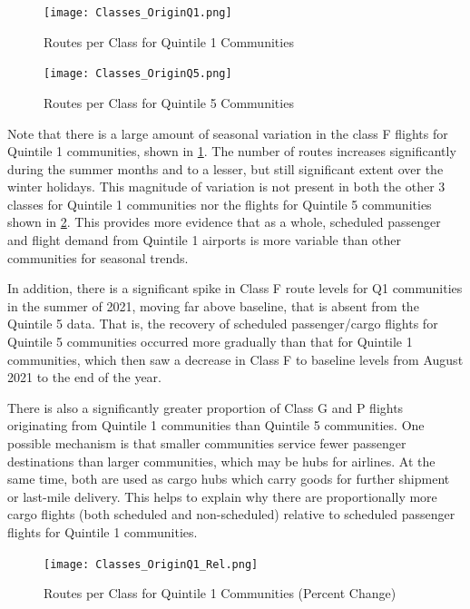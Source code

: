 \documentclass[11pt]{article}
\begin{document}
\begin{figure}[htbp]
\centerline{\texttt{[image: Classes\_OriginQ1.png]}}
\caption{Routes per Class for Quintile 1 Communities}
\label{Classes_OriginQ1}
\end{figure}

\begin{figure}[htbp]
\centerline{\texttt{[image: Classes\_OriginQ5.png]}}
\caption{Routes per Class for Quintile 5 Communities}
\label{Classes_OriginQ5}
\end{figure}

\-\hspace{0.5cm} Note that there is a large amount of seasonal variation in the class F flights for Quintile 1 communities, shown in \cref{Classes_OriginQ1}. The number of routes increases significantly during the summer months and to a lesser, but still significant extent over the winter holidays. This magnitude of variation is not present in both the other 3 classes for Quintile 1 communities nor the flights for Quintile 5 communities shown in \cref{Classes_OriginQ5}. This provides more evidence that as a whole, scheduled passenger and flight demand from Quintile 1 airports is more variable than other communities for seasonal trends.

\-\hspace{0.5cm} In addition, there is a significant spike in Class F route levels for Q1 communities in the summer of 2021, moving far above baseline, that is absent from the Quintile 5 data. That is, the recovery of scheduled passenger/cargo flights for Quintile 5 communities occurred more gradually than that for Quintile 1 communities, which then saw a decrease in Class F to baseline levels from August 2021 to the end of the year.

\-\hspace{0.5cm} There is also a significantly greater proportion of Class G and P flights originating from Quintile 1 communities than Quintile 5 communities. One possible mechanism is that smaller communities service fewer passenger destinations than larger communities, which may be hubs for airlines. At the same time, both are used as cargo hubs which carry goods for further shipment or last-mile delivery. This helps to explain why there are proportionally more cargo flights (both scheduled and non-scheduled) relative to scheduled passenger flights for Quintile 1 communities.


\begin{figure}[htbp]
\centerline{\texttt{[image: Classes\_OriginQ1\_Rel.png]}}
\caption{Routes per Class for Quintile 1 Communities (Percent Change)}
\label{Classes_OriginQ1_rel}
\end{figure}
\end{document}

